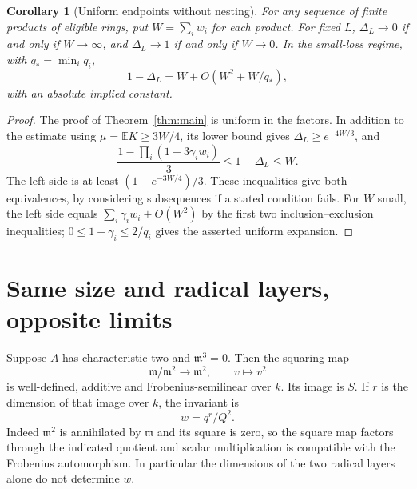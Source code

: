 \documentclass[11pt]{article}
\newtheorem{corollary}[theorem]{Corollary}
\theoremstyle{remark}\newtheorem{remark}[theorem]{Remark}
\newcommand{\m}{\mathfrak m}
\newcommand{\E}{\mathbb E}
\begin{document}
\begin{corollary}[Uniform endpoints without nesting]\label{cor:endpoints}
For any sequence of finite products of eligible rings, put $W=\sum_i w_i$ for each product. For fixed $L$, $\Delta_L\to0$ if and only if $W\to\infty$, and $\Delta_L\to1$ if and only if $W\to0$. In the small-loss regime, with $q_* =\min_i q_i$,
\[
 1-\Delta_L=W+O(W^2+W/q_*),
\]
with an absolute implied constant.
\end{corollary}
\begin{proof}
The proof of Theorem~\ref{thm:main} is uniform in the factors. In addition to the estimate using $\mu=\E K\ge3W/4$, its lower bound gives $\Delta_L\ge e^{-4W/3}$, and
\[
 \frac{1-\prod_i(1-3\gamma_iw_i)}{3}\le1-\Delta_L\le W.
\]
The left side is at least $(1-e^{-3W/4})/3$. These inequalities give both equivalences, by considering subsequences if a stated condition fails. For $W$ small, the left side equals $\sum_i\gamma_iw_i+O(W^2)$ by the first two inclusion--exclusion inequalities; $0\le1-\gamma_i\le2/q_i$ gives the asserted uniform expansion.
\end{proof}

\section{Same size and radical layers, opposite limits}
Suppose $A$ has characteristic two and $\m^3=0$. Then the squaring map
\[
 \m/\m^2\longrightarrow\m^2,\qquad v\longmapsto v^2
\]
is well-defined, additive and Frobenius-semilinear over $k$. Its image is $S$. If $r$ is the dimension of that image over $k$, the invariant is
\begin{equation}\label{eq:rank}
 w=q^r/Q^2.
\end{equation}
Indeed $\m^2$ is annihilated by $\m$ and its square is zero, so the square map factors through the indicated quotient and scalar multiplication is compatible with the Frobenius automorphism. In particular the dimensions of the two radical layers alone do not determine $w$.
\end{document}
